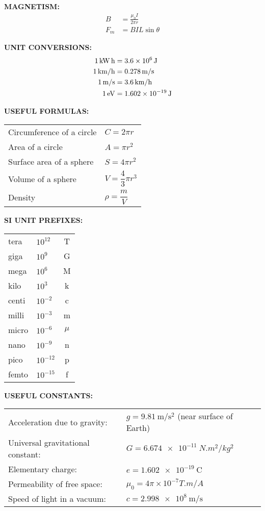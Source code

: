 \documentclass{../oss-handout}
\begin{document}
\begin{multicols*}{3}
  \textbf{MAGNETISM:}
  \begin{align*}
    B &=\frac{\mu_0I}{2\pi r}\\
    F_m&=BIL\sin\theta
  \end{align*}

  \textbf{UNIT CONVERSIONS:}
  \begin{align*}
    \SI1{\kilo\watt.\hour} &=\SI{3.6e6}\joule\\
    \SI1{km/h} &=\SI{0.278}{m/s}\\
    \SI1{m/s} &=\SI{3.6}{km/h}\\
    \SI1\electronvolt &=\SI{1.602e-19}\joule
  \end{align*}
  \columnbreak
  
  \textbf{USEFUL FORMULAS:}

  \vspace{.1in}
  \begin{tabular}{ll}
    Circumference of a circle & $C=2\pi r$\\
    Area of a circle          & $A=\pi r^2$\\
    Surface area of a sphere  & $S=4\pi r^2$\\
    Volume of a sphere        & $V=\dfrac43\pi r^3$\\
    Density & $\rho=\dfrac mV$
  \end{tabular}

  \vspace{.1in}
  \textbf{SI UNIT PREFIXES:}

  \vspace{.1in}
  \begin{tabular}{llc}
    tera  & $10^{12}$ & T \\
    giga  & $10^9$  & G \\
    mega  & $10^6$  & M \\
    kilo  & $10^3$  & k \\
    centi & $10^{-2}$ & c \\
    milli & $10^{-3}$ & m \\
    micro & $10^{-6}$ & $\mu$ \\
    nano  & $10^{-9}$ & n \\
    pico  & $10^{-12}$ & p \\
    femto & $10^{-15}$ & f
  \end{tabular}
    
  \vspace{.1in}
  \textbf{USEFUL CONSTANTS:}

  \vspace{.1in}
  \begin{tabular}{ll}
    Acceleration due to gravity: &
    $g=\SI{9.81}{\meter\per\second\squared}$ (near surface of Earth)\\
    Universal gravitational constant: & $G=\SI{6.674e-11}{N.m^2/kg^2}$\\
    Elementary charge:  & $e=\SI{1.602e-19}\coulomb$\\
    Permeability of free space: & $\mu_0=4\pi\times10^{-7}\si{T.m/A}$\\
  Speed of light in a vacuum: & $c=\SI{2.998e8}{\metre\per\second}$
  \end{tabular}
\end{multicols*}
\end{document}
